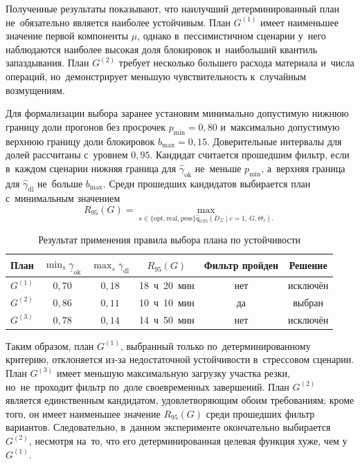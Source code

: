 Полученные результаты показывают, что наилучший детерминированный план не~обязательно является наиболее устойчивым. План $G^{(1)}$ имеет наименьшее значение первой компоненты $\mu$, однако в~пессимистичном сценарии у~него наблюдаются наиболее высокая доля блокировок и~наибольший квантиль запаздывания. План $G^{(2)}$ требует несколько большего расхода материала и~числа операций, но~демонстрирует меньшую чувствительность к~случайным возмущениям.

Для формализации выбора заранее установим минимально допустимую нижнюю границу доли прогонов без просрочек $p_{\min}=0{,}80$ и~максимально допустимую верхнюю границу доли блокировок $b_{\max}=0{,}15$. Доверительные интервалы для долей рассчитаны с~уровнем $0{,}95$. Кандидат считается прошедшим фильтр, если в~каждом сценарии нижняя граница для $\widehat{\gamma}_{\mathrm{ok}}$ не~меньше $p_{\min}$, а~верхняя граница для $\widehat{\gamma}_{\mathrm{dl}}$ не~больше $b_{\max}$. Среди прошедших кандидатов выбирается план с~минимальным значением
\[
    R_{95}(G)=\max_{s\in\{\mathrm{opt},\mathrm{real},\mathrm{pess}\}
    \widehat{q}_{0.95}\!\left(D_{\Sigma}\mid c=1,\ G,\Theta_s\right).}
    \]
    
    \begin{table}[htbp]
        \centering
        \small
        \caption{Результат применения правила выбора плана по устойчивости}
        \label{tab:stability_selection}
        \begin{tabular}{|c|c|c|c|c|c|}
            \hline
            План & $\min_s\underline{\gamma}_{\mathrm{ok}}$ &
            $\max_s\overline{\gamma}_{\mathrm{dl}}$ & $R_{95}(G)$ &
            Фильтр пройден & Решение \\
            \hline
            $G^{(1)}$ & $0{,}70$ & $0{,}18$ & 18~ч~20~мин & нет & исключён \\
            \hline
            $G^{(2)}$ & $0{,}86$ & $0{,}11$ & 10~ч~10~мин & да & выбран \\
            \hline
            $G^{(3)}$ & $0{,}78$ & $0{,}14$ & 14~ч~50~мин & нет & исключён \\
            \hline
        \end{tabular}
    \end{table}
        
        Таким образом, план $G^{(1)}$, выбранный только по~детерминированному критерию, отклоняется из-за недостаточной устойчивости в~стрессовом сценарии. План $G^{(3)}$ имеет меньшую максимальную загрузку участка резки, но~не~проходит фильтр по~доле своевременных завершений. План $G^{(2)}$ является единственным кандидатом, удовлетворяющим обоим требованиям; кроме того, он имеет наименьшее значение $R_{95}(G)$ среди прошедших фильтр вариантов. Следовательно, в~данном эксперименте окончательно выбирается $G^{(2)}$, несмотря на~то, что его детерминированная целевая функция хуже, чем у~$G^{(1)}$.
        
